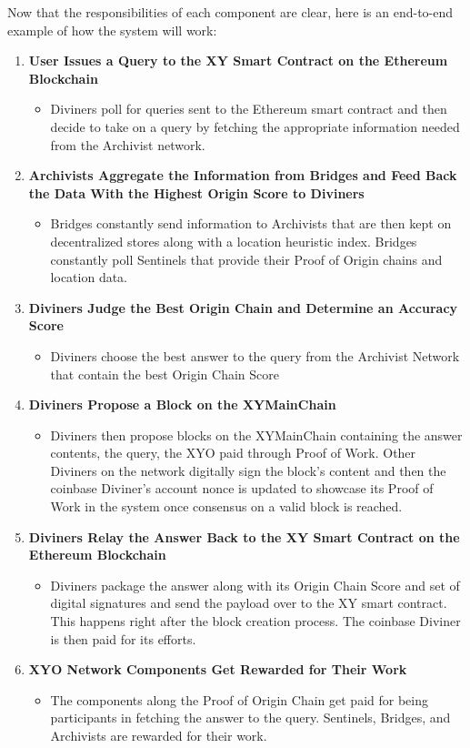 \documentclass{article}
\begin{document}
Now that the responsibilities of each component are clear, here is an end-to-end example of how the system will work:

\begin{enumerate}
  \item \textbf{User Issues a Query to the XY Smart Contract on the Ethereum Blockchain}
  \begin{itemize}
    \item Diviners poll for queries sent to the Ethereum smart contract and then decide to take on a query by fetching the appropriate information needed from the Archivist network.
  \end{itemize}
  \item \textbf{Archivists Aggregate the Information from Bridges and Feed Back the Data With the Highest Origin Score to Diviners}
  \begin{itemize}
    \item Bridges constantly send information to Archivists that are then kept on decentralized stores along with a location heuristic index. Bridges constantly poll Sentinels that provide their Proof of Origin chains and location data.
  \end{itemize}
  \item \textbf{Diviners Judge the Best Origin Chain and Determine an Accuracy Score}
  \begin{itemize}
    \item Diviners choose the best answer to the query from the Archivist Network that contain the best Origin Chain Score
  \end{itemize}
  \item \textbf{Diviners Propose a Block on the XYMainChain}
  \begin{itemize}
    \item Diviners then propose blocks on the XYMainChain containing the answer contents, the query, the XYO paid through Proof of Work. Other Diviners on the network digitally sign the block's content and then the coinbase Diviner's account nonce is updated to showcase its Proof of Work in the system once consensus on a valid block is reached.
  \end{itemize}
  \item \textbf{Diviners Relay the Answer Back to the XY Smart Contract on the Ethereum Blockchain}
  \begin{itemize}
    \item Diviners package the answer along with its Origin Chain Score and set of digital signatures and send the payload over to the XY smart contract. This happens right after the block creation process. The coinbase Diviner is then paid for its efforts.
  \end{itemize}
  \item \textbf{XYO Network Components Get Rewarded for Their Work}
  \begin{itemize}
    \item The components along the Proof of Origin Chain get paid for being participants in fetching the answer to the query. Sentinels, Bridges, and Archivists are rewarded for their work.
  \end{itemize}
\end{enumerate}
\end{document}
